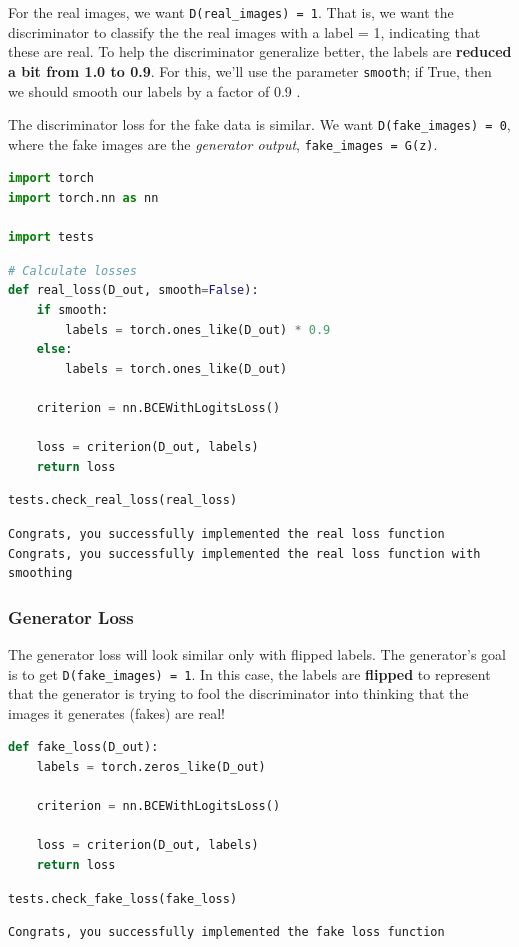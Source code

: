 For the real images, we want
\lstinline{D(real_images) = 1}. That is, we want the
discriminator to classify the the real images with a label = 1,
indicating that these are real. To help the discriminator generalize
better, the labels are \textbf{reduced a bit from 1.0 to 0.9}. For this,
we'll use the parameter \lstinline{smooth}; if True, then
we should smooth our labels by a factor of 0.9 .\newline

The discriminator loss for the fake data is similar. We want
\lstinline{D(fake_images) = 0}, where the fake images are
the \emph{generator output},
\lstinline{fake_images = G(z)}.

\begin{lstlisting}[language=Python]
import torch
import torch.nn as nn

import tests
\end{lstlisting}

\begin{lstlisting}[language=Python]
# Calculate losses
def real_loss(D_out, smooth=False):
    if smooth:
        labels = torch.ones_like(D_out) * 0.9
    else:
        labels = torch.ones_like(D_out)
    
    criterion = nn.BCEWithLogitsLoss()
    
    loss = criterion(D_out, labels)
    return loss
\end{lstlisting}

\begin{lstlisting}[language=Python]
tests.check_real_loss(real_loss)
\end{lstlisting}

\begin{lstlisting}
Congrats, you successfully implemented the real loss function
Congrats, you successfully implemented the real loss function with smoothing
\end{lstlisting}

\subsubsection{Generator Loss}\label{generator-loss}

The generator loss will look similar only with flipped labels. The
generator's goal is to get
\lstinline{D(fake_images) = 1}. In this case, the labels
are \textbf{flipped} to represent that the generator is trying to fool
the discriminator into thinking that the images it generates (fakes) are
real!

\begin{lstlisting}[language=Python]
def fake_loss(D_out):
    labels = torch.zeros_like(D_out)
    
    criterion = nn.BCEWithLogitsLoss()
    
    loss = criterion(D_out, labels)
    return loss
\end{lstlisting}

\begin{lstlisting}[language=Python]
tests.check_fake_loss(fake_loss)
\end{lstlisting}

\begin{lstlisting}
Congrats, you successfully implemented the fake loss function
\end{lstlisting}
